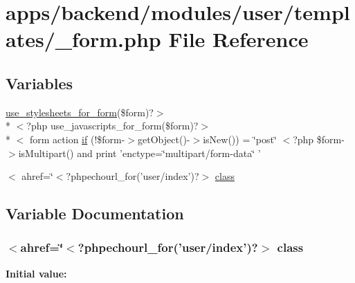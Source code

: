 \hypertarget{backend_2modules_2user_2templates_2__form_8php}{\section{apps/backend/modules/user/templates/\-\_\-form.php File Reference}
\label{backend_2modules_2user_2templates_2__form_8php}
}
\subsection*{Variables}
\begin{DoxyCompactItemize}
\item 
\hyperlink{live_2modules_2user_2templates_2__form_8php_a86bc4522fdbe625b07bc4a4d6eec3df7}{use\-\_\-stylesheets\-\_\-for\-\_\-form}(\$form)?$>$\\*
$<$?php use\-\_\-javascripts\-\_\-for\-\_\-form(\$form)?$>$\\*
$<$ form action \hyperlink{backend_2modules_2user_2templates_2__form_8php_ae30a307b320d8da5d9a945eaf68f7549}{if} (!\$form-\/$>$get\-Object()-\/$>$is\-New()) = \char`\"{}post\char`\"{} $<$?php \$form-\/$>$is\-Multipart() and print 'enctype=\char`\"{}multipart/form-\/data\char`\"{} '
\item 
$<$ ahref=\char`\"{}$<$?phpechourl\-\_\-for('user/index')?$>$ \hyperlink{backend_2modules_2user_2templates_2__form_8php_a79862cae5134ddcbe720c493ce85bdc4}{class}
\end{DoxyCompactItemize}


\subsection{Variable Documentation}
\hypertarget{backend_2modules_2user_2templates_2__form_8php_a79862cae5134ddcbe720c493ce85bdc4}{
\subsubsection[{class}]{\setlength{\rightskip}{0pt plus 5cm}$<$ahref=\char`\"{}$<$?phpechourl\-\_\-for('user/index')?$>$ class}}\label{backend_2modules_2user_2templates_2__form_8php_a79862cae5134ddcbe720c493ce85bdc4}
{\bfseries Initial value\-:}


